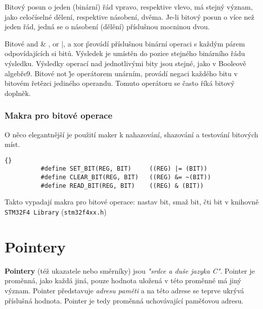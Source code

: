       Bitový posun o jeden (binární) řád vpravo, respektive vlevo, má stejný význam, jako 
      celočíselné dělení, respektive násobení, dvěma. Je-li bitový posun o více než jeden řád, 
      jedná se o násobení (dělění) příslušnou mocninou dvou.
      
      Bitové and \& , or |, a xor \^ provádí příslušnou binární operaci s každým párem 
      odpovídajících si bitů. Výsledek je umístěn do pozice stejného binárního řádu výsledku. 
      Výsledky operací nad jednotlivými bity jsou  stejné, jako v Booleově algebře9. Bitové not \~ 
      je operátorem unárním, provádí negaci každého bitu v bitovém řetězci jediného operandu. 
      Tomuto operátoru se často říká bitový doplněk. 
      
      \subsubsection{Makra pro bitové operace}
        O něco elegantnější je použití maker k nahazování, shazování a testování bitových míst. 
        \lstset{numbers=none}
        \begin{lstlisting}{}
          #define SET_BIT(REG, BIT)     ((REG) |= (BIT))
          #define CLEAR_BIT(REG, BIT)   ((REG) &= ~(BIT))
          #define READ_BIT(REG, BIT)    ((REG) & (BIT))
        \end{lstlisting}
        Takto vypadají makra pro bitové operace: nastav bit, smaž bit, čti bit v knihovně 
        \texttt{STM32F4 Library} (\texttt{stm32f4xx.h})
      
  \section{Pointery}
    \textbf{Pointery} (též ukazatele nebo směrníky) jsou \emph{"srdce a duše jazyka C"}. Pointer je 
    proměnná, jako každá jiná, pouze hodnota uložená v této proměnné má jiný význam. Pointer 
    představuje \textit{adresu paměti} a na této adrese se teprve ukrývá příslušná hodnota. Pointer 
    je tedy proměnná uchovávající paměťovou adresu.\cite{Herout}
  
